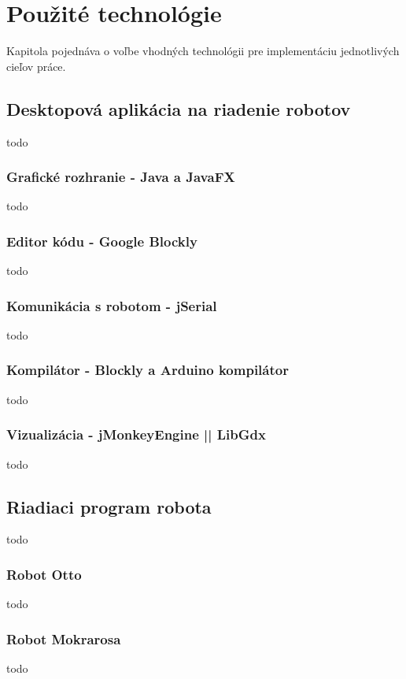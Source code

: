\chapter{Použité technológie}
\label{kap:technologie}

Kapitola pojednáva o voľbe vhodných technológii pre implementáciu jednotlivých cieľov práce.

\section{Desktopová aplikácia na riadenie robotov}
todo

\subsection{Grafické rozhranie - Java a JavaFX}
todo

\subsection{Editor kódu - Google Blockly}
\label{kap:GrafickyProgramovaciJayzk}
todo

\subsection{Komunikácia s robotom - jSerial}
todo

\subsection{Kompilátor - Blockly a Arduino kompilátor}
todo

\subsection{Vizualizácia - jMonkeyEngine || LibGdx}
todo

\section{Riadiaci program robota}
todo

\subsection{Robot Otto}
todo

\subsection{Robot Mokrarosa}
todo
